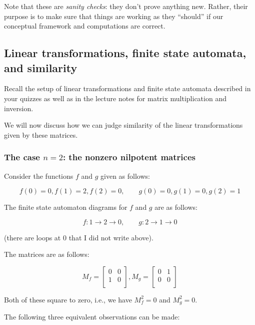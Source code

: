 \documentclass[10pt]{amsart}
\begin{document}
Note that these are {\em sanity checks}: they don't prove anything
new. Rather, their purpose is to make sure that things are working as
they ``should'' if our conceptual framework and computations are
correct.


\subsection{Linear transformations, finite state automata, and similarity}

Recall the setup of linear transformations and finite state automata
described in your quizzes as well as in the lecture notes for matrix
multiplication and inversion.

We will now discuss how we can judge similarity of the linear
transformations given by these matrices.

\subsubsection{The case $n = 2$: the nonzero nilpotent matrices}\label{sec:nilpotent2by2}

Consider the functions $f$ and $g$ given as follows:

$$f(0) = 0, f(1) = 2, f(2) = 0, \qquad g(0) = 0, g(1) = 0, g(2) = 1$$

The finite state automaton diagrams for $f$ and $g$ are as follows:

$$f: 1 \to 2 \to 0, \qquad g: 2 \to 1 \to 0$$

(there are loops at $0$ that I did not write above).

The matrices are as follows:

$$M_f = \left[\begin{matrix} 0 & 0 \\ 1 & 0 \\\end{matrix}\right], M_g = \left[\begin{matrix} 0 & 1 \\ 0 & 0 \\\end{matrix}\right]$$

Both of these square to zero, i.e., we have $M_f^2 = 0$ and $M_g^2 =
0$.

The following three equivalent observations can be made:
\end{document}
